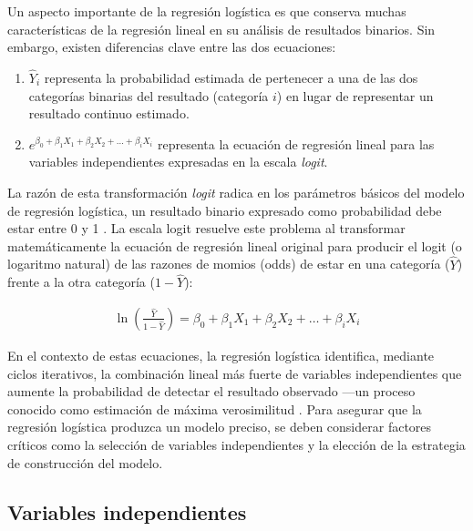\documentclass[12pt]{article}
\begin{document}
Un aspecto importante de la regresi\'on log\'istica es que conserva muchas caracter\'isticas de la regresi\'on lineal en su an\'alisis de resultados binarios. Sin embargo, existen diferencias clave entre las dos ecuaciones:

\begin{enumerate}
  \item $\hat{Y}_i$ representa la probabilidad estimada de pertenecer a una de las dos categor\'ias binarias del resultado (categor\'ia $i$) en lugar de representar un resultado continuo estimado.
  
  \item $e^{\beta_0 + \beta_1 X_1 + \beta_2 X_2 + \ldots + \beta_i X_i}$ representa la ecuaci\'on de regresi\'on lineal para las variables independientes expresadas en la escala \textit{logit}.
\end{enumerate}

La raz\'on de esta transformaci\'on \textit{logit} radica en los par\'ametros b\'asicos del modelo de regresi\'on log\'istica, un resultado binario expresado como probabilidad debe estar entre 0 y 1 \cite{darlington1990}. La escala logit resuelve este problema al transformar matem\'aticamente la ecuaci\'on de regresi\'on lineal original para producir el logit (o logaritmo natural) de las razones de momios (odds) de estar en una categor\'ia ($\hat{Y}$) frente a la otra categor\'ia ($1 - \hat{Y}$):

\begin{eqnarray}
\ln\left(\frac{\hat{Y}}{1 - \hat{Y}}\right) = \beta_0 + \beta_1 X_1 + \beta_2 X_2 + \ldots + \beta_i X_i
\end{eqnarray}

En el contexto de estas ecuaciones, la regresi\'on log\'istica identifica, mediante ciclos iterativos, la combinaci\'on lineal m\'as fuerte de variables independientes que aumente la probabilidad de detectar el resultado observado —un proceso conocido como estimaci\'on de m\'axima verosimilitud \cite{tabachnick2007,hosmer2000}. Para asegurar que la regresi\'on log\'istica produzca un modelo preciso, se deben considerar factores cr\'iticos como la selecci\'on de variables independientes y la elecci\'on de la estrategia de construcci\'on del modelo.

\subsection{Variables independientes}
\end{document}

